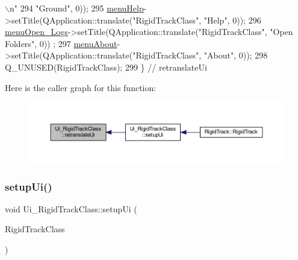 \begin{DoxyCode}
{      \(\backslash\)n"}
294 \textcolor{stringliteral}{"Ground"}, 0));
295         \hyperlink{class_ui___rigid_track_class_a2df43c6bb7db7e366a64bc8dbbbab7cc}{menuHelp}->setTitle(QApplication::translate(\textcolor{stringliteral}{"RigidTrackClass"}, \textcolor{stringliteral}{"Help"}, 0));
296         \hyperlink{class_ui___rigid_track_class_a1df91ff9df043558cf6d3c1dd6557250}{menuOpen\_Logs}->setTitle(QApplication::translate(\textcolor{stringliteral}{"RigidTrackClass"}, \textcolor{stringliteral}{"Open Folders"}, 0))
      ;
297         \hyperlink{class_ui___rigid_track_class_a4c36fbc72f56540b472d7a8724690896}{menuAbout}->setTitle(QApplication::translate(\textcolor{stringliteral}{"RigidTrackClass"}, \textcolor{stringliteral}{"About"}, 0));
298         Q\_UNUSED(RigidTrackClass);
299     \} \textcolor{comment}{// retranslateUi}
\end{DoxyCode}
Here is the caller graph for this function\+:\nopagebreak
\begin{figure}[H]
\begin{center}
\leavevmode
\includegraphics[width=350pt]{class_ui___rigid_track_class_a7c96951c4e173848e7695d6bd7883af6_icgraph}
\end{center}
\end{figure}
\mbox{\label{class_ui___rigid_track_class_a7f78fefc15716049b873bef4d3450e38}} 
\subsubsection{\texorpdfstring{setup\+Ui()}{setupUi()}}
{\footnotesize\ttfamily void Ui\+\_\+\+Rigid\+Track\+Class\+::setup\+Ui (\begin{DoxyParamCaption}\item[{Q\+Main\+Window $\ast$}]{Rigid\+Track\+Class }\end{DoxyParamCaption})\hspace{0.3cm}{\ttfamily [inline]}}



